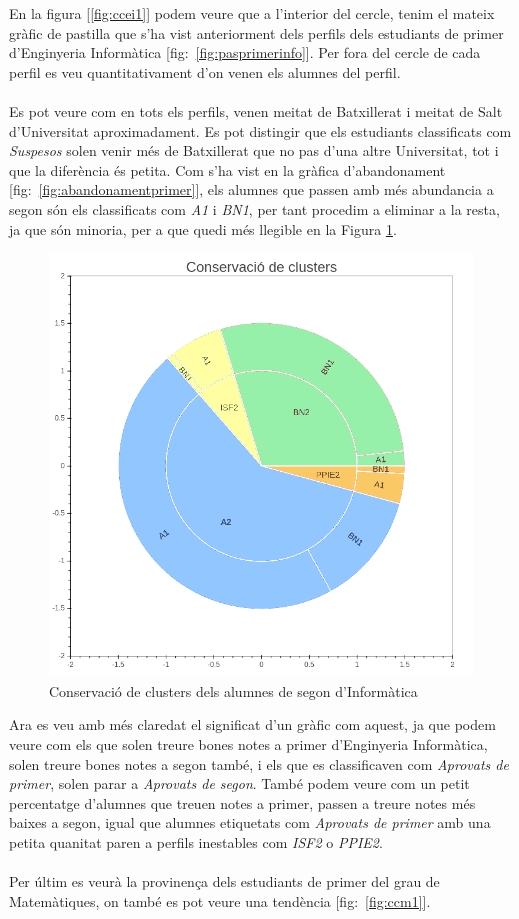 \documentclass[12pt,a4paper,catalan]{article}
\begin{document}
En la figura [\ref{fig:ccei1}] podem veure que a l'interior del cercle, tenim el mateix gràfic de pastilla que s'ha vist anteriorment dels perfils dels estudiants de primer d'Enginyeria Informàtica [fig:~\ref{fig:pasprimerinfo}]. Per fora del cercle de cada perfil es veu quantitativament d'on venen els alumnes del perfil. 
\\
\\
Es pot veure com en tots els perfils, venen meitat de Batxillerat i meitat de Salt d'Universitat aproximadament. Es pot distingir que els estudiants classificats com \textit{Suspesos} solen venir més de Batxillerat que no pas d'una altre Universitat, tot i que la diferència és petita. Com s'ha vist en la gràfica d'abandonament [fig:~\ref{fig:abandonamentprimer}], els alumnes que passen amb més abundancia a segon són els classificats com \textit{A1} i \textit{BN1}, per tant procedim a eliminar a la resta, ja que són minoria, per a que quedi més llegible en la Figura \ref{fig:ccei2}.

\begin{figure}[h]
\centering
\includegraphics[width=.6\linewidth]{img/conservacio_clusters_segon_info.png}
\caption{Conservació de clusters dels alumnes de segon d'Informàtica}
\label{fig:ccei2}
\end{figure}

Ara es veu amb més claredat el significat d'un gràfic com aquest, ja que podem veure com els que solen treure bones notes a primer d'Enginyeria Informàtica, solen treure bones notes a segon també, i els que es classificaven com \textit{Aprovats de primer}, solen parar a \textit{Aprovats de segon}. També podem veure com un petit percentatge d'alumnes que treuen notes a primer, passen a treure notes més baixes a segon, igual que alumnes etiquetats com \textit{Aprovats de primer} amb una petita quanitat paren a perfils inestables com \textit{ISF2} o \textit{PPIE2}.
\\
\\
Per últim es veurà la provinença dels estudiants de primer del grau de Matemàtiques, on també es pot veure una tendència [fig:~\ref{fig:ccm1}].
\end{document}
